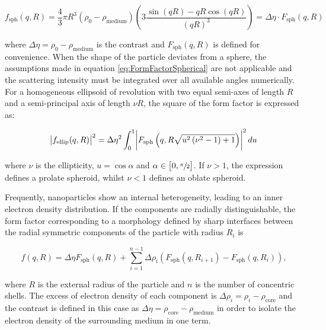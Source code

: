 \begin{equation}
        \label{eq:ff_sphere}
       f_{\text{sph}}(q,R)=\frac{4}{3}\pi R^3 \left( \rho_0 - \rho_{\text{medium}} \right) \left( 3\frac{\sin(qR)-qR\cos(qR)}{\left( qR \right)^3} \right) = \Delta \eta \cdot F_{\text{sph}}(q,R)
\end{equation}

where $\Delta \eta = \rho_0 - \rho_{\text{medium}}$ is the contrast and $ F_{\text{sph}}(q,R)$ is defined for convenience. When the shape of the particle deviates from a sphere, the assumptions made in equation \ref{eq:FormFactorSpherical} are not applicable and the scattering intensity must be integrated over all available angles numerically. For a homogeneous ellipsoid of revolution with two equal semi-axes of length $R$ and a semi-principal axis of length $\nu R $, the square of the form factor is expressed as:

\begin{equation}
        \label{eq:ff_ellipsoid}
       \abs{ f_{\text{ellip}}(q,R) }^2 = \Delta \eta^2 \int_0^1 \abs{F_{\text{sph}}\left( q,R \sqrt{u^2\left( \nu^2 -1 \right) + 1} \right)}^2 du
\end{equation}

where $\nu$ is the ellipticity, $u = \cos{\alpha}$ and $\alpha \in \left[  0, \sfrac{\pi}{2} \right]$. If $\nu > 1$, the expression defines a prolate spheroid, whilst $\nu < 1$ defines an oblate spheroid.

Frequently, nanoparticles show an internal heterogeneity, leading to an inner electron density distribution. If the components are radially distinguishable, the form factor corresponding to a morphology defined by sharp interfaces between the radial symmetric components of the particle with radius \(R_i\) is

\begin{equation}
\label{eq:multicore-shell}
f\left(q,R \right)= \Delta \eta F_{\text{sph}}(q,R)+\sum_{i=1}^{n-1} \Delta\rho_i \left( F_{\text{sph}}(q,R_{i+1})-F_{\text{sph}}(q,R_{i}) \right) ,
\end{equation}

where \(R\) is the external radius of the particle and \( n \) is the number of concentric shells. The excess of electron density of each component is $\Delta\rho_i = \rho_i - \rho_{\text{core}}$ and the contrast is defined in this case as $\Delta \eta = \rho_{\text{core}} - \rho_{\text{medium}}$ in order to isolate the electron density of the surrounding medium in one term.

